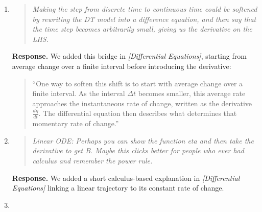 \documentclass[11pt]{article}
\newcommand{\response}{\textbf{Response.} }
\newcommand{\secit}[1]{\textit{[#1]}}
\newcommand{\msq}[1]{\begin{quote}\small\noindent``#1''\end{quote}}
\newenvironment{reviewerpoint}{\begin{quote}\itshape}{\end{quote}}
\begin{document}
\begin{enumerate}[label=\textbf{Reviewer 1, Minor Point \arabic*.}]
\response We strengthened the motivation for continuous-time modelling in \secit{Introduction} and at the opening of \secit{Univariate Dynamic Systems in Continuous Time}:
\msq{Continuous-time representations are particularly valuable for theory-oriented model development, because of the more natural link between continuous-time parameters and typical theoretical interests.
Because many psychological processes --- such as emotion regulation, stress responses, symptom fluctuation, learning, physiological regulation, or cognitive fatigue --- are thought to evolve continuously rather than only when measured, continuous-time models provide a natural representation.
Parameters such as drift (state dependence), diffusion (system noise), and external inputs align much more closely with mechanistic interpretations, instead of as artifacts of the measurement schedule as with discrete-time models.
Continuous-time models are also useful when observation intervals vary or when the time scale of change is substantively important.}
\item

\begin{reviewerpoint}
Making the step from discrete time to continuous time could be softened by rewriting the DT model into a difference equation, and then say that the time step becomes arbitrarily small, giving us the derivative on the LHS.
\end{reviewerpoint}

\response We added this bridge in \secit{Differential Equations}, starting from average change over a finite interval before introducing the derivative:
\msq{One way to soften this shift is to start with average change over a finite interval.
As the interval $\Delta t$ becomes smaller, this average rate approaches the instantaneous rate of change, written as the derivative $\frac{d\eta}{dt}$.
The differential equation then describes what determines that momentary rate of change.}
\item

\begin{reviewerpoint}
Linear ODE: Perhaps you can show the function eta and then take the derivative to get B.
Maybe this clicks better for people who ever had calculus and remember the power rule.
\end{reviewerpoint}

\response We added a short calculus-based explanation in \secit{Differential Equations} linking a linear trajectory to its constant rate of change.
\item


\end{enumerate}
\end{document}
